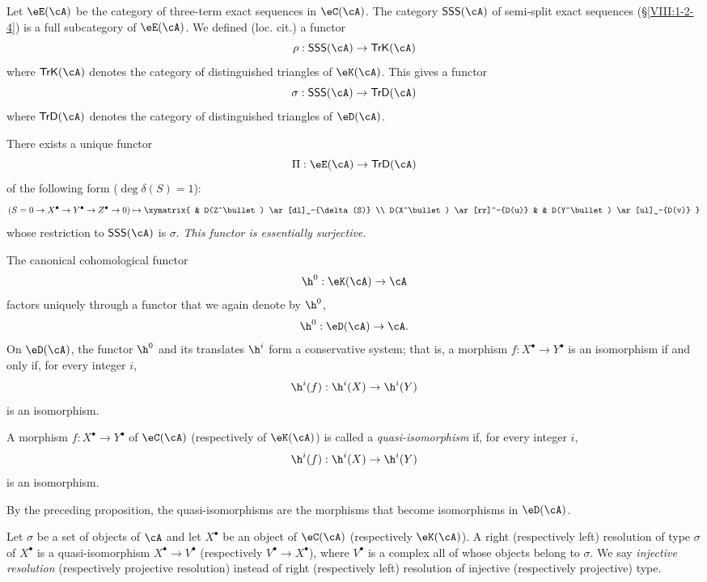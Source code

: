 \documentclass[oneside]{book}
\begin{document}
Let $\eE(\cA)$ be the category of three-term exact sequences in
$\eC(\cA)$. The category $\mathsf{SSS}(\cA)$ of semi-split exact
sequences (\S\ref{VIII:1-2-4}) is a full subcategory of $\eE(\cA)$.
We defined (loc. cit.) a functor
\[
  \rho:\mathsf{SSS}(\cA) \to \mathsf{TrK}(\cA)
\]
where $\mathsf{TrK}(\cA)$ denotes the category of distinguished triangles
of $\eK(\cA)$. This gives a functor
\[
  \sigma : \mathsf{SSS}(\cA) \to \mathsf{TrD}(\cA)
\]
where $\mathsf{TrD}(\cA)$ denotes the category of distinguished triangles
of $\eD(\cA)$.

\begin{proposition}\label{VIII:3-1-5}
There exists a unique functor
\[
  \Pi:\eE(\cA) \to \mathsf{TrD}(\cA)
\]
of the following form ($\deg \delta(S)=1$):
\[
(S=0 \to X^\bullet \to Y^\bullet \to Z^\bullet \to 0)
\mapsto
\xymatrix{
  & D(Z^\bullet) \ar[dl]_-{\delta(S)} \\
  D(X^\bullet) \ar[rr]^-{D(u)}
    & & D(Y^\bullet) \ar[ul]_-{D(v)}
}
\]
whose restriction to $\mathsf{SSS}(\cA)$ is $\sigma$. \emph{This functor
is essentially surjective.}
\end{proposition}

\begin{proposition}\label{VIII:3-1-6}
The canonical cohomological functor
\[
  \h^0:\eK(\cA) \to \cA
\]
factors uniquely through a functor that we again denote by $\h^0$,
\[
  \h^0:\eD(\cA) \to \cA \text{.}
\]
On $\eD(\cA)$, the functor $\h^0$ and its translates $\h^i$ form a
conservative system; that is, a morphism $f:X^\bullet \to Y^\bullet$ is
an isomorphism if and only if, for every integer $i$,
\[
  \h^i(f):\h^i(X) \to \h^i(Y)
\]
is an isomorphism.
\end{proposition}

\begin{definition}\label{VIII:3-1-7}
A morphism $f:X^\bullet \to Y^\bullet$ of $\eC(\cA)$ (respectively of
$\eK(\cA)$) is called a \emph{quasi-isomorphism} if, for every integer
$i$,
\[
  \h^i(f):\h^i(X) \to \h^i(Y)
\]
is an isomorphism.
\end{definition}

By the preceding proposition, the quasi-isomorphisms are the morphisms
that become isomorphisms in $\eD(\cA)$.

\begin{definition}\label{VIII:3-1-8}
Let $\sigma$ be a set of objects of $\cA$ and let $X^\bullet$ be an
object of $\eC(\cA)$ (respectively $\eK(\cA)$). A right (respectively
left) resolution of type $\sigma$ of $X^\bullet$ is a quasi-isomorphism
$X^\bullet \to V^\bullet$ (respectively $V^\bullet \to X^\bullet$), where
$V^\bullet$ is a complex all of whose objects belong to $\sigma$. We say
\emph{injective resolution} (respectively projective resolution) instead
of right (respectively left) resolution of injective (respectively
projective) type.
\end{definition}
\end{document}
